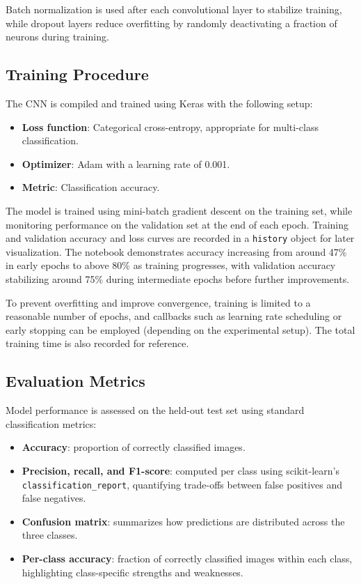 \documentclass[conference]{IEEEtran}
\begin{document}
Batch normalization is used after each convolutional layer to stabilize training, while dropout layers reduce overfitting by randomly deactivating a fraction of neurons during training.

\subsection{Training Procedure}

The CNN is compiled and trained using Keras with the following setup:
\begin{itemize}
    \item \textbf{Loss function}: Categorical cross-entropy, appropriate for multi-class classification.
    \item \textbf{Optimizer}: Adam with a learning rate of 0.001.
    \item \textbf{Metric}: Classification accuracy.
\end{itemize}

The model is trained using mini-batch gradient descent on the training set, while monitoring performance on the validation set at the end of each epoch. Training and validation accuracy and loss curves are recorded in a \texttt{history} object for later visualization. The notebook demonstrates accuracy increasing from around 47\% in early epochs to above 80\% as training progresses, with validation accuracy stabilizing around 75\% during intermediate epochs before further improvements.

To prevent overfitting and improve convergence, training is limited to a reasonable number of epochs, and callbacks such as learning rate scheduling or early stopping can be employed (depending on the experimental setup). The total training time is also recorded for reference.

\subsection{Evaluation Metrics}

Model performance is assessed on the held-out test set using standard classification metrics:
\begin{itemize}
    \item \textbf{Accuracy}: proportion of correctly classified images.
    \item \textbf{Precision, recall, and F1-score}: computed per class using scikit-learn's \texttt{classification\_report}, quantifying trade-offs between false positives and false negatives.
    \item \textbf{Confusion matrix}: summarizes how predictions are distributed across the three classes.
    \item \textbf{Per-class accuracy}: fraction of correctly classified images within each class, highlighting class-specific strengths and weaknesses.
\end{itemize}
\end{document}
